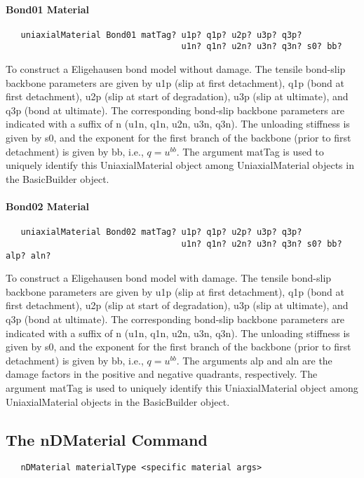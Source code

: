 \documentclass[12pt]{article}
\begin{document}
\paragraph{Bond01 Material}
{\sf\small
\begin{verbatim}
   uniaxialMaterial Bond01 matTag? u1p? q1p? u2p? u3p? q3p?
                                   u1n? q1n? u2n? u3n? q3n? s0? bb?
\end{verbatim}  
}

To construct a Eligehausen bond model without damage. The tensile bond-slip backbone
parameters are given by u1p (slip at first detachment), q1p (bond at first
detachment), u2p (slip at start of degradation), u3p (slip at ultimate), and
q3p (bond at ultimate). The corresponding bond-slip backbone parameters are
indicated with a suffix of n (u1n, q1n, u2n, u3n, q3n).  The unloading stiffness
is given by s0, and the exponent for the first branch of the backbone (prior
to first detachment) is given by bb, i.e., $q = u^{bb}$. The argument 
matTag is used to uniquely identify this UniaxialMaterial object among 
UniaxialMaterial objects in the BasicBuilder object.


\paragraph{Bond02 Material}
{\sf\small
\begin{verbatim}
   uniaxialMaterial Bond02 matTag? u1p? q1p? u2p? u3p? q3p?
                                   u1n? q1n? u2n? u3n? q3n? s0? bb? alp? aln?
\end{verbatim}
}

To construct a Eligehausen bond model with damage. The tensile bond-slip backbone
parameters are given by u1p (slip at first detachment), q1p (bond at first
detachment), u2p (slip at start of degradation), u3p (slip at ultimate), and
q3p (bond at ultimate). The corresponding bond-slip backbone parameters are
indicated with a suffix of n (u1n, q1n, u2n, u3n, q3n).  The unloading stiffness
is given by s0, and the exponent for the first branch of the backbone (prior
to first detachment) is given by bb, i.e., $q = u^{bb}$. The arguments
alp and aln are the damage factors in the positive and negative quadrants,
respectively. The argument 
matTag is used to uniquely identify this UniaxialMaterial object among 
UniaxialMaterial objects in the BasicBuilder object.


\subsection{The nDMaterial Command}
{\sf\small
\begin{verbatim}
   nDMaterial materialType <specific material args>
\end{verbatim}
}
\end{document}
